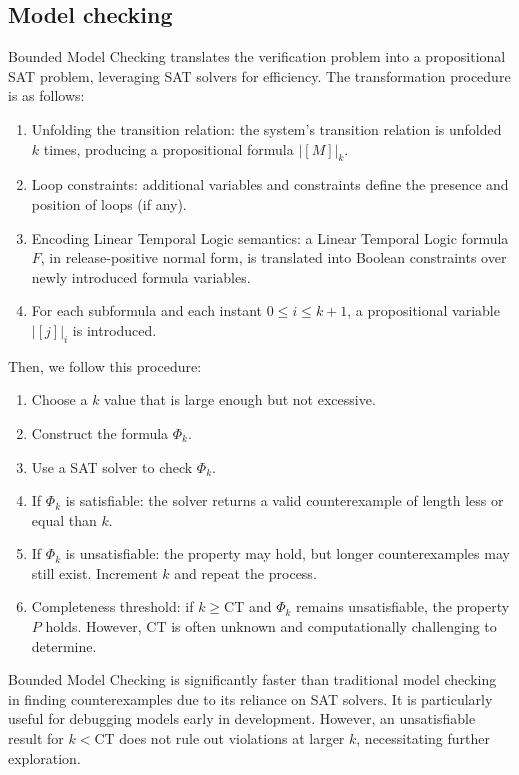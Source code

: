 \subsection{Model checking}
Bounded Model Checking translates the verification problem into a propositional SAT problem, leveraging SAT solvers for efficiency.
The transformation procedure is as follows: 
\begin{enumerate}
    \item Unfolding the transition relation: the system's transition relation is unfolded $k$ times, producing a propositional formula ${\left\lvert [M]\right\rvert }_k$. 
    \item Loop constraints: additional variables and constraints define the presence and position of loops (if any). 
    \item Encoding Linear Temporal Logic semantics: a Linear Temporal Logic formula $F$, in release-positive normal form, is translated into Boolean constraints over newly introduced formula variables.
    \item For each subformula and each instant $0\leq i \leq k+1$, a propositional variable ${\left\lvert [j]\right\rvert }_i$ is introduced.
\end{enumerate}
\noindent Then, we follow this procedure: 
\begin{enumerate}
    \item Choose a $k$ value that is large enough but not excessive.
    \item Construct the formula $\Phi_k$.
    \item Use a SAT solver to check $\Phi_k$. 
    \item If $\Phi_k$ is satisfiable: the solver returns a valid counterexample of length less or equal than $k$.
    \item If $\Phi_k$ is unsatisfiable: the property may hold, but longer counterexamples may still exist. 
        Increment $k$ and repeat the process.
    \item Completeness threshold: if $k\geq\text{CT}$ and $\Phi_k$ remains unsatisfiable, the property $P$ holds. 
        However, $\text{CT}$ is often unknown and computationally challenging to determine.
\end{enumerate}
\noindent Bounded Model Checking is significantly faster than traditional model checking in finding counterexamples due to its reliance on SAT solvers.
It is particularly useful for debugging models early in development.
However, an unsatisfiable result for $k<\text{CT}$ does not rule out violations at larger $k$, necessitating further exploration.